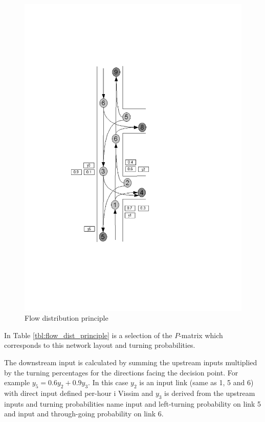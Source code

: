 \begin{figure}[!ht]
\begin{center}
\includegraphics[scale=0.6]{trafficcount_to_routes_sketch.png} 
\end{center}
\caption{Flow distribution principle}
\label{fig:flow_dist_principle}
\end{figure}

In Table \ref{tbl:flow_dist_principle} is a selection of the $P$-matrix which corresponds to this network layout and turning probabilities.

The downstream input is calculated by summing the upstream inputs multiplied by the turning percentages for the directions facing the decision point. For example $y_5 = 0.6 y_2 + 0.9 y_3$. In this case $y_2$ is an input link (same as 1, 5 and 6) with direct input defined per-hour i Vissim and $y_3$ is derived from the upstream inputs and turning probabilities name input and left-turning probability on link 5 and input and through-going probability on link 6.

